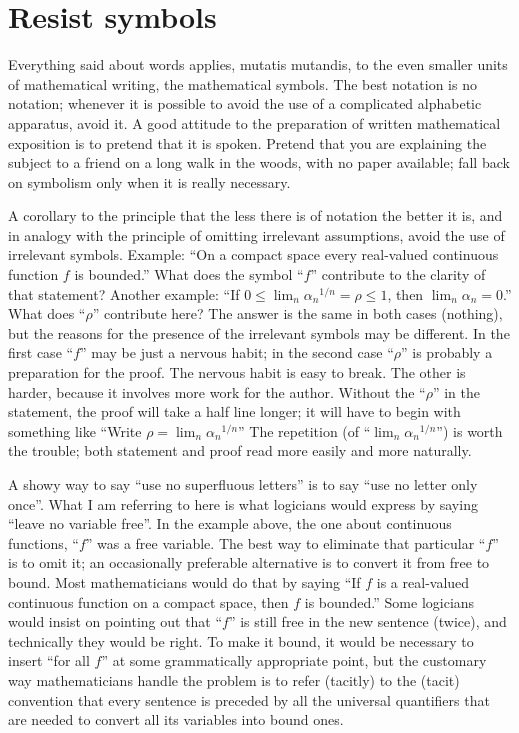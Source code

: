 \documentclass[12pt]{article}
\begin{document}
\section{Resist symbols}

Everything said about words applies, mutatis mutandis, to the even smaller units of mathematical writing, the mathematical symbols. The best notation is no notation; whenever it is possible to avoid the use of a complicated alphabetic apparatus, avoid it. A good attitude to the preparation of written mathematical exposition is to pretend that it is spoken. Pretend that you are explaining the subject to a friend on a long walk in the woods, with no paper available; fall back on symbolism only when it is really necessary. 

A corollary to the principle that the less there is of notation the better it is, and in analogy with the principle of omitting irrelevant assumptions, avoid the use of irrelevant symbols. Example: ``On a compact space every real-valued continuous function $f$ is bounded.'' What does the symbol ``$f$'' contribute to the clarity of that statement? Another example: ``If $0 \le \lim_{n}{\alpha_{n}}^{1/n} = \rho\le1$, then $\lim_{n}\alpha_{n} = 0$.'' What does ``$\rho$'' contribute here? The answer is the same in both cases (nothing), but the reasons for the presence of the irrelevant symbols may be different. In the first case ``$f$'' may be just a nervous habit; in the second case ``$\rho$'' is probably a preparation for the proof. The nervous habit is easy to break. The other is harder, because it involves more work for the author. Without the ``$\rho$'' in the statement, the proof will take a half line longer; it will have to begin with something like ``Write $\rho=\lim_{n}{\alpha_{n}}^{1/n}$'' The repetition (of ``$\lim_{n}{\alpha_{n}}^{1/n}$'') is worth the trouble; both statement and proof read more easily and more naturally. 

A showy way to say ``use no superfluous letters'' is to say ``use no letter only once''. What I am referring to here is what logicians would express by saying ``leave no variable free''. In the example above, the one about continuous functions, ``$f$'' was a free variable. The best way to eliminate that particular ``$f$'' is to omit it; an occasionally preferable alternative is to convert it from free to bound. Most mathematicians would do that by saying ``If $f$ is a real-valued continuous function on a compact space, then $f$ is bounded.'' Some logicians would insist on pointing out that ``$f$'' is still free in the new sentence (twice), and technically they would be right. To make it bound, it would be necessary to insert ``for all $f$'' at some grammatically appropriate point, but the customary way mathematicians handle the problem is to refer (tacitly) to the (tacit) convention that every sentence is preceded by all the universal quantifiers that are needed to convert all its variables into bound ones. 
\end{document}
